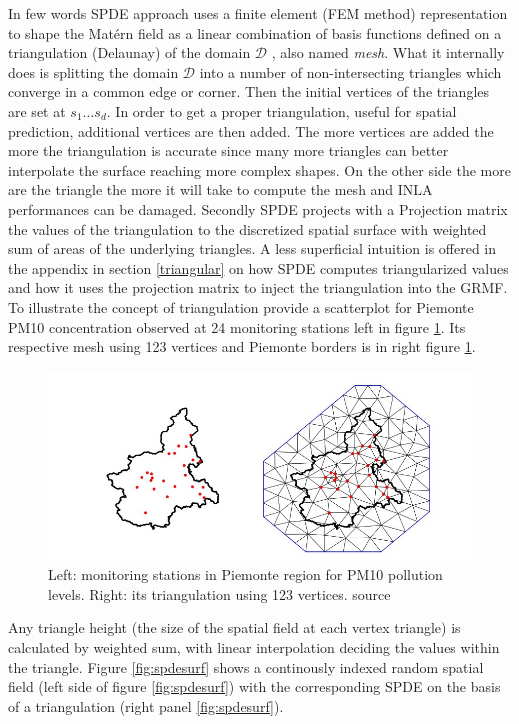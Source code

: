 \documentclass[
  12pt,
  a4paper,
  oneside]{book}
\theoremstyle{definition}
\theoremstyle{definition}
\theoremstyle{definition}
\theoremstyle{remark}
\begin{document}
In few words SPDE approach uses a finite element (FEM method) representation to shape the Matérn field as a linear combination of basis functions defined on a triangulation (Delaunay) of the domain \(\mathcal{D}\) \citeyearpar{Cameletti2012}, also named \emph{mesh}. What it internally does is splitting the domain \(\mathcal{D}\) into a number of non-intersecting triangles which converge in a common edge or corner. Then the initial vertices of the triangles are set at \(s_1 \ldots s_d\). In order to get a proper triangulation, useful for spatial prediction, additional vertices are then added. The more vertices are added the more the triangulation is accurate since many more triangles can better interpolate the surface reaching more complex shapes. On the other side the more are the triangle the more it will take to compute the mesh and INLA performances can be damaged. Secondly SPDE projects with a Projection matrix the values of the triangulation to the discretized spatial surface with weighted sum of areas of the underlying triangles. A less superficial intuition is offered in the appendix in section \ref{triangular} on how SPDE computes triangularized values and how it uses the projection matrix to inject the triangulation into the GRMF.\\
To illustrate the concept of triangulation \citet{Cameletti2012} provide a scatterplot for Piemonte PM10 concentration observed at 24 monitoring stations left in figure \ref{fig:piepm10}. Its respective mesh using 123 vertices and Piemonte borders is in right figure \ref{fig:piepm10}.

\begin{figure}
\centering
\includegraphics{images/piemonte_pm10.jpg}
\caption{\label{fig:piepm10}Left: monitoring stations in Piemonte region for PM10 pollution levels. Right: its triangulation using 123 vertices. \citet{Cameletti2012} source}
\end{figure}

Any triangle height (the size of the spatial field at each vertex triangle) is calculated by weighted sum, with linear interpolation deciding the values within the triangle. Figure \ref{fig:spdesurf} shows a continously indexed random spatial field (left side of figure \ref{fig:spdesurf}) with the corresponding SPDE on the basis of a triangulation (right panel \ref{fig:spdesurf}).
\end{document}
